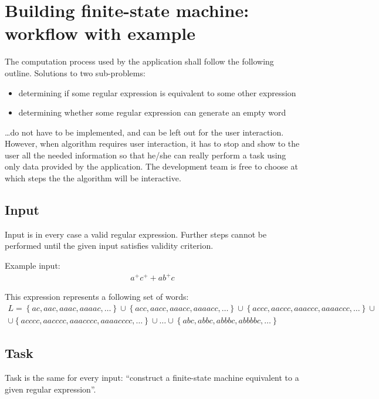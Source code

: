 \documentclass{article}
\begin{document}
\section{Building finite-state machine: workflow with example}
The computation process used by the application shall follow the following outline. Solutions to two
sub-problems:
\begin{itemize}

  \item determining if some regular expression is equivalent to some other expression

  \item determining whether some regular expression can generate an empty word

\end{itemize}

\ldots do not have to be implemented, and can be left out for the user interaction. However, when
algorithm requires user interaction, it has to stop and show to the user all the needed information
so that he/she can really perform a task using only data provided by the application. The
development team is free to choose at which steps the the algorithm will be interactive.

\subsection{Input}
Input is in every case a valid regular expression. Further steps cannot be performed until the given
input satisfies validity criterion.

Example input:
\begin{gather*}
a^+c^+ + ab^+c
\end{gather*}

This expression represents a following set of words:
\begin{gather*}
L = \left\{ ac, aac, aaac, aaaac, \ldots \right\} %
\cup \left\{ acc, aacc, aaacc, aaaacc, \ldots \right\} %
\cup \left\{ accc, aaccc, aaaccc, aaaaccc, \ldots \right\} \cup \\
\cup \left\{ acccc, aacccc, aaacccc, aaaacccc, \ldots \right\} %
\cup \ldots %
\cup \left\{ abc, abbc, abbbc, abbbbc, \ldots \right\}
\end{gather*}

\subsection{Task}
Task is the same for every input: ``construct a finite-state machine equivalent to a given regular
expression''.
\end{document}
